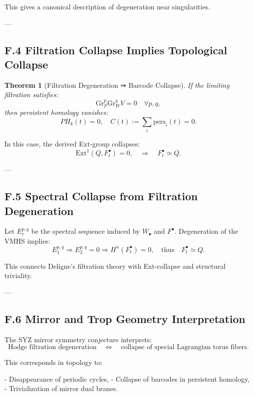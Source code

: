 \documentclass[11pt]{article}
\newtheorem{theorem}{Theorem}[section]
\begin{document}
This gives a canonical description of degeneration near singularities.

---

\subsection*{F.4 Filtration Collapse Implies Topological Collapse}

\begin{theorem}[Filtration Degeneration ⇒ Barcode Collapse]
If the limiting filtration satisfies:
\[
\mathrm{Gr}_F^p \mathrm{Gr}_W^q V = 0 \quad \forall p,q,
\]
then persistent homology vanishes:
\[
PH_k(t) = 0, \quad C(t) := \sum_i \text{pers}_i(t) = 0.
\]
\end{theorem}

\begin{corollary}
In this case, the derived Ext-group collapses:
\[
\mathrm{Ext}^1(Q, F^\bullet_t) = 0,
\quad \Rightarrow \quad
F^\bullet_t \simeq Q.
\]
\end{corollary}

---

\subsection*{F.5 Spectral Collapse from Filtration Degeneration}

Let $E_r^{p,q}$ be the spectral sequence induced by $W_\bullet$ and $F^\bullet$.  
Degeneration of the VMHS implies:
\[
E_1^{p,q} \Rightarrow E_2^{p,q} = 0 \Rightarrow H^n(F^\bullet_t) = 0,
\quad \text{thus} \quad F^\bullet_t \simeq Q.
\]

This connects Deligne’s filtration theory with Ext-collapse and structural triviality.

---

\subsection*{F.6 Mirror and Trop Geometry Interpretation}

The SYZ mirror symmetry conjecture interprets:
\[
\text{Hodge filtration degeneration}
\quad \Leftrightarrow \quad
\text{collapse of special Lagrangian torus fibers}.
\]

This corresponds in topology to:

- Disappearance of periodic cycles,
- Collapse of barcodes in persistent homology,
- Trivialization of mirror dual branes.
\end{document}
